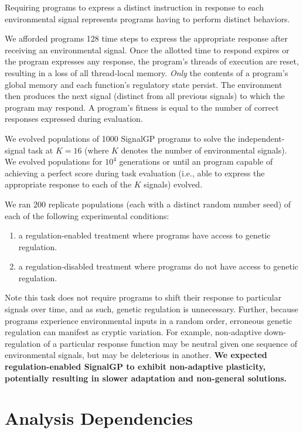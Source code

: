 \documentclass[]{book}
\providecommand{\tightlist}{%
  \setlength{\itemsep}{0pt}\setlength{\parskip}{0pt}}
\begin{document}
Requiring programs to express a distinct instruction in response to each environmental signal represents programs having to perform distinct behaviors.

We afforded programs 128 time steps to express the appropriate response after receiving an environmental signal.
Once the allotted time to respond expires or the program expresses any response, the program's threads of execution are reset, resulting in a loss of all thread-local memory.
\emph{Only} the contents of a program's global memory and each function's regulatory state persist.
The environment then produces the next signal (distinct from all previous signals) to which the program may respond.
A program's fitness is equal to the number of correct responses expressed during evaluation.

We evolved populations of 1000 SignalGP programs to solve the independent-signal task at \(K=16\) (where \(K\) denotes the number of environmental signals).
We evolved populations for \ensuremath{10^{4}} generations or until an program capable of achieving a perfect score during task evaluation (i.e., able to express the appropriate response to each of the \(K\) signals) evolved.

We ran 200 replicate populations (each with a distinct random number seed) of each of the following experimental conditions:

\begin{enumerate}
\def\labelenumi{\arabic{enumi}.}
\tightlist
\item
  a regulation-enabled treatment where programs have access to genetic regulation.
\item
  a regulation-disabled treatment where programs do not have access to genetic regulation.
\end{enumerate}

Note this task does not require programs to shift their response to particular signals over time, and as such, genetic regulation is unnecessary.
Further, because programs experience environmental inputs in a random order, erroneous genetic regulation can manifest as cryptic variation.
For example, non-adaptive down-regulation of a particular response function may be neutral given one sequence of environmental signals, but may be deleterious in another.
\textbf{We expected regulation-enabled SignalGP to exhibit non-adaptive plasticity, potentially resulting in slower adaptation and non-general solutions.}

\hypertarget{analysis-dependencies-4}{%
\section{Analysis Dependencies}\label{analysis-dependencies-4}}
\end{document}
